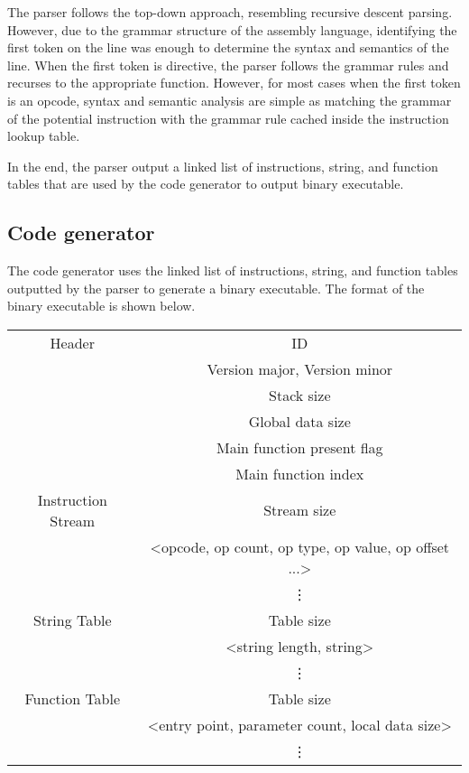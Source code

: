 \documentclass[manuscript,screen,nonacm]{acmart}
\begin{document}
The parser follows the top-down approach, resembling recursive descent parsing. However, due to the grammar structure of the assembly language, identifying the first token on the line was enough to determine the syntax and semantics of the line. When the first token is directive, the parser follows the grammar rules and recurses to the appropriate function. However, for most cases when the first token is an opcode, syntax and semantic analysis are simple as matching the grammar of the potential instruction with the grammar rule cached inside the instruction lookup table.

In the end, the parser output a linked list of instructions, string, and function tables that are used by the code generator to output binary executable.

\subsection{Code generator}
The code generator uses the linked list of instructions, string, and function tables outputted by the parser to generate a binary executable. The format of the binary executable is shown below.

\begin{center}
\begin{tabular}{| c | c |}
    \hline
    Header & ID \\
    ~ & Version major, Version minor \\
    ~ & Stack size \\
    ~ & Global data size \\
    ~ & Main function present flag \\
    ~ & Main function index \\
    \hline
    Instruction Stream & Stream size \\
    ~ & <opcode, op count, op type, op value, op offset ...> \\
    ~ & \vdots \\
    \hline
    String Table & Table size \\
    ~ & <string length, string> \\
    ~ & \vdots \\
    \hline
    Function Table & Table size \\
    ~ & <entry point, parameter count, local data size> \\
    ~ & \vdots \\
    \hline
\end{tabular}
\end{center}
\end{document}
